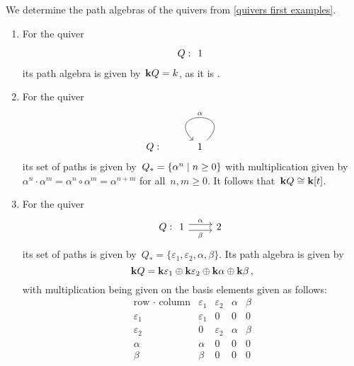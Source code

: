\begin{example}
  We determine the path algebras of the quivers from \cref{quivers first examples}.
  \begin{enumerate}
    \item
      For the quiver
      \[
        Q :
        \begin{tikzcd}
          1
        \end{tikzcd}
      \]
      its path algebra is given by~$\mathbf{k} Q = k$, as it is .
    \item
      For the quiver
      \[
        Q :
        \begin{tikzcd}
            1
            \arrow[loop]{r}[above]{\alpha}
        \end{tikzcd}
      \]
      its set of paths is given by~$Q_* = \{ \alpha^n \suchthat n \geq 0 \}$ with multiplication given by~$\alpha^n \cdot \alpha^m = \alpha^n \circ \alpha^m = \alpha^{n+m}$ for all~$n, m \geq 0$.
      It follows that~$\mathbf{k} Q \cong \mathbf{k}[t]$.
    \item
      For the quiver
      \[
        Q :
        \begin{tikzcd}
            1
            \arrow[shift left = 0.3em]{r}[above]{\alpha}
            \arrow[shift right = 0.3em]{r}[below]{\beta}
          & 2
        \end{tikzcd}
      \]
      its set of paths is given by~$Q_* = \{ \varepsilon_1, \varepsilon_2, \alpha, \beta \}$.
      Its path algebra is given by
      \[
          \mathbf{k} Q
        = \mathbf{k} \varepsilon_1 \oplus \mathbf{k} \varepsilon_2 \oplus \mathbf{k} \alpha \oplus \mathbf{k} \beta \,,
      \]
      with multiplication being given on the basis elements given as follows:
      \[
        \begin{array}{r|cccc}
            \text{row $\cdot$ column}
          & \varepsilon_1
          & \varepsilon_2
          & \alpha
          & \beta
          \\
          \hline
            \varepsilon_1
          & \varepsilon_1
          & 0
          & 0
          & 0
          \\
            \varepsilon_2
          & 0
          & \varepsilon_2
          & \alpha
          & \beta
          \\
            \alpha
          & \alpha
          & 0
          & 0
          & 0
          \\
            \beta
          & \beta
          & 0
          & 0
          & 0
        \end{array}
      \]

  \end{enumerate}
\end{example}


